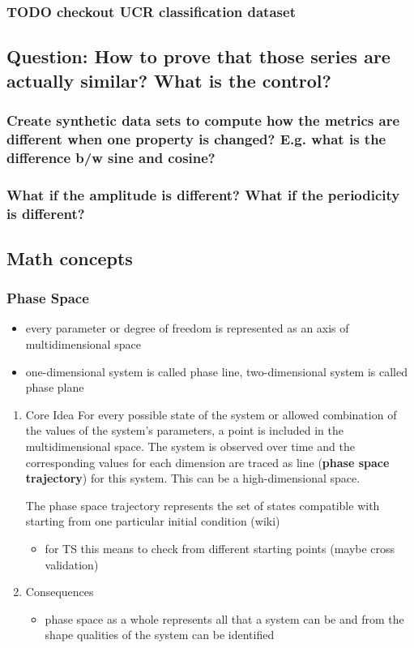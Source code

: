 \documentclass[11pt]{article}
\begin{document}
\subsubsection{{\bfseries\sffamily TODO} checkout UCR classification dataset}
\label{sec:orgce3b05a}

\subsection{Question: How to prove that those series are actually similar? What is the control?}
\label{sec:org046ae14}
\subsubsection{Create synthetic data sets to compute how the metrics are different when one property is changed? E.g. what is the difference b/w sine and cosine?}
\label{sec:org041e20d}
\subsubsection{What if the amplitude is different? What if the periodicity is different?}
\label{sec:org35e3707}

\subsection{Math concepts}
\label{sec:org0d2609d}
\subsubsection{Phase Space}
\label{sec:orge5311ac}
\begin{itemize}
\item every parameter or degree of freedom is represented as an axis of multidimensional space
\item one-dimensional system is called phase line, two-dimensional system is called phase plane
\end{itemize}
\begin{enumerate}
\item Core Idea
\label{sec:org9d3695c}
For every possible state of the system or allowed combination of the values of the system's parameters, a point is included in the multidimensional space. The system is observed over time and the corresponding values for each dimension are traced as line (\textbf{phase space trajectory}) for this system. This can be a high-dimensional space.

The phase space trajectory represents the set of states  compatible  with starting from one particular initial condition (wiki)
\begin{itemize}
\item for TS this means to check from different starting points (maybe cross validation)
\end{itemize}
\item Consequences
\label{sec:org2badbc1}
\begin{itemize}
\item phase space as a whole represents all that a system can be and from the shape qualities of the system can be identified
\end{itemize}
\end{enumerate}
\end{document}
